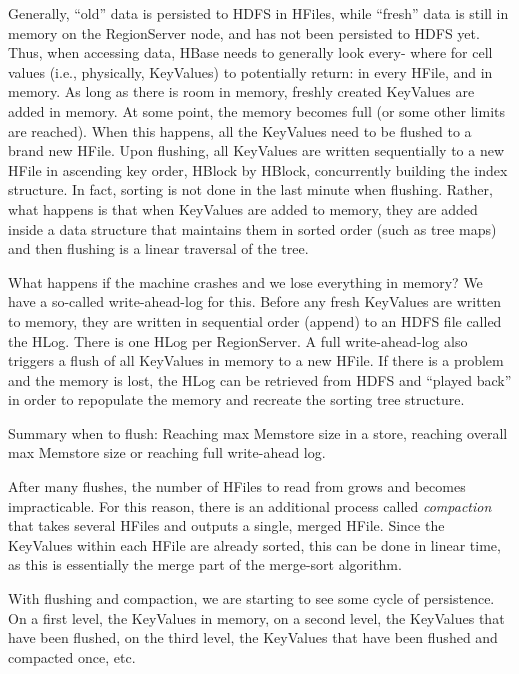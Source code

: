 Generally, “old” data is persisted to HDFS in HFiles, while “fresh” data is still in memory on the RegionServer node, and has not been persisted to HDFS yet. Thus, when accessing data, HBase needs to generally look every- where for cell values (i.e., physically, KeyValues) to potentially return: in every HFile, and in memory. As long as there is room in memory, freshly created KeyValues are added in memory. At some point, the memory becomes full (or some other limits are reached). When this happens, all the KeyValues need to be flushed to a brand new HFile. Upon flushing, all KeyValues are written sequentially to a new HFile in ascending key order, HBlock by HBlock, concurrently building the index structure. In fact, sorting is not done in the last minute when flushing. Rather, what happens is that when KeyValues are added to memory, they are added inside a data structure that maintains them in sorted order (such as tree maps) and then flushing is a linear traversal of the tree.

What happens if the machine crashes and we lose everything in memory? We have a so-called write-ahead-log for this. Before any fresh KeyValues are written to memory, they are written in sequential order (append) to an HDFS file called the HLog. There is one HLog per RegionServer. A full write-ahead-log also triggers a flush of all KeyValues in memory to a new HFile. If there is a problem and the memory is lost, the HLog can be retrieved from HDFS and “played back” in order to repopulate the memory and recreate the sorting tree structure.

Summary when to flush: Reaching max Memstore size in a store, reaching overall max Memstore size or reaching full write-ahead log.

After many flushes, the number of HFiles to read from grows and becomes impracticable. For this reason, there is an additional process called \textit{compaction} that takes several HFiles and outputs a single, merged HFile. Since the KeyValues within each HFile are already sorted, this can be done in linear time, as this is essentially the merge part of the merge-sort algorithm.

With flushing and compaction, we are starting to see some cycle of persistence. On a first level, the KeyValues in memory, on a second level, the KeyValues that have been flushed, on the third level, the KeyValues that have been flushed and compacted once, etc.

